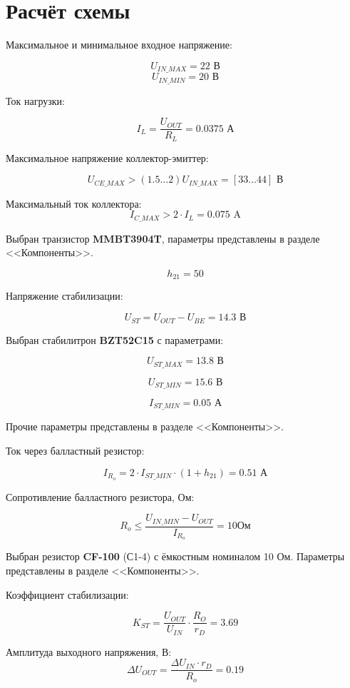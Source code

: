 \chapter{Расчёт схемы}
Максимальное и минимальное входное напряжение:

\[
U_{IN\_MAX} = 22 \text{ В}
\]
\[
U_{IN\_MIN} = 20 \text{ В}
\]

Ток нагрузки:

\[
I_L=\frac{U_{OUT}}{R_L} =0.0375 \text{ А}
\]

Максимальное напряжение коллектор-эмиттер:

\[
U_{CE\_MAX}>(1.5…2) U_{IN\_MAX}=[33…44] \text{ В}
\]

Максимальный ток коллектора:
\[
I_{C\_MAX}>2 \cdot I_L=0.075 \text{ A}
\]

Выбран транзистор \textbf{MMBT3904T}, параметры представлены в разделе <<Компоненты>>.

\[
h_{21}=50
\]

Напряжение стабилизации:

\[
U_{ST}=U_{OUT}-U_{BE}=14.3 \text{ В}
\]

Выбран стабилитрон \textbf{BZT52C15} с параметрами:

\[
U_{ST\_MAX}=13.8 \text{ В}
\]

\[
U_{ST\_MIN}=15.6 \text{ В}
\]

\[
I_{ST\_MIN}=0.05 \text{ А}
\]

Прочие параметры представлены в разделе <<Компоненты>>.

Ток через балластный резистор:

\[
I_{R_o}=2 \cdot I_{ST\_MIN} \cdot  (1+h_{21})=0.51 \text{ А}
\]

Сопротивление балластного резистора, Ом:

\[
R_o \leq \frac{U_{IN\_MIN}-U_{OUT}}{I_{R_o}} =10 Ом
\]

Выбран резистор \textbf{CF-100} (С1-4) с ёмкостным номиналом 10 Ом. Параметры представлены в разделе <<Компоненты>>.

Коэффициент стабилизации:

\[
K_{ST}=\frac{U_{OUT}}{U_{IN}} \cdot   \frac{R_O}{r_D} =3.69
\]

Амплитуда выходного напряжения, В:
\[
\Delta U_{OUT}=\frac{\Delta U_{IN} \cdot r_D}{R_o} = 0.19
\]
